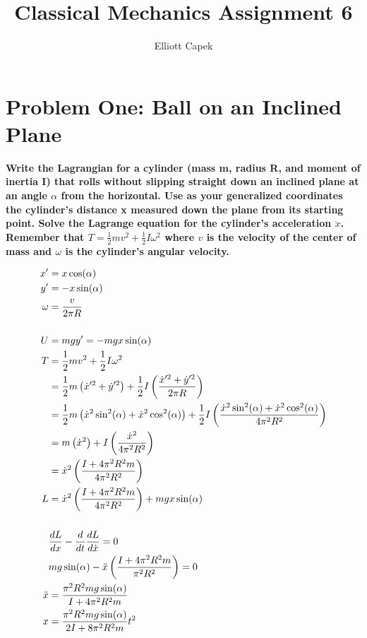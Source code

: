 \documentclass[10pt]{article} %
\title{Classical Mechanics Assignment 6}
\author{Elliott Capek}
\begin{document}
\maketitle{}

\section{Problem One: Ball on an Inclined Plane}
\textbf{Write the Lagrangian for a cylinder (mass m, radius R, and moment of inertia I) that rolls without slipping straight down an inclined plane at an angle $\alpha$ from the horizontal. Use as your generalized coordinates the cylinder’s distance x measured down the plane from its starting point. Solve the Lagrange equation for the cylinder’s acceleration $\ddot{x}$. Remember that $T = \frac{1}{2} mv^2 + \frac{1}{2} I\omega^2$ where $v$ is the velocity of the center of mass and $\omega$ is the cylinder’s angular velocity.}

\begin{align*}
  x' &= x\cos(\alpha)\\
  y' &= -x\sin(\alpha)\\
  \omega &= \frac{v}{2\pi R}\\
  \vspace{1cm}\\
  U &= mgy' = -mgx\sin(\alpha)\\
  T &= \frac{1}{2}mv^2 + \frac{1}{2}I\omega^2\\
  &= \frac{1}{2}m\left(\dot{x}'^2 + \dot{y}'^2\right) + \frac{1}{2}I\left(\frac{\dot{x}'^2 + \dot{y}'^2}{2\pi R}\right)\\
  &= \frac{1}{2}m\left(\dot{x}^2\sin^2(\alpha) + \dot{x}^2\cos^2(\alpha)\right) + \frac{1}{2}I\left(\frac{\dot{x}^2\sin^2(\alpha) + \dot{x}^2\cos^2(\alpha)}{4\pi^2R^2}\right)\\
  &= m\left(\dot{x}^2\right) + I\left(\frac{\dot{x}^2}{4\pi^2R^2}\right)\\
  &= \dot{x}^2\left(\frac{I + 4\pi^2R^2m}{4\pi^2R^2}\right)\\
  L &= \dot{x}^2\left(\frac{I + 4\pi^2R^2m}{4\pi^2R^2}\right) + mgx\sin(\alpha)\\
  \vspace{1cm}\\
  &\frac{dL}{dx} - \frac{d}{dt}\frac{dL}{d\dot{x}} = 0\\
  &mg\sin(\alpha) - \ddot{x}\left(\frac{I + 4\pi^2R^2m}{\pi^2R^2}\right) = 0\\
  \ddot{x} &= \frac{\pi^2R^2mg\sin(\alpha)}{I + 4\pi^2R^2m}\\
  x &= \frac{\pi^2R^2mg\sin(\alpha)}{2I + 8\pi^2R^2m}t^2
\end{align*}
\end{document}
